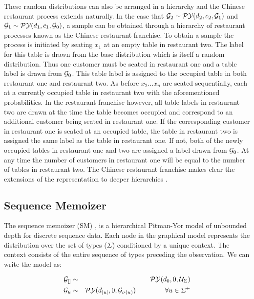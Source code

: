 These random distributions can also be arranged in a hierarchy and the Chinese restaurant process extends naturally.  In the case that $\G_2 \sim \PY(d_2, c_2, \G_1)$ and $\G_1 \sim \PY(d_1, c_1, \G_0)$, a sample can be obtained through a hierarchy of restaurant processes known as the Chinese restaurant franchise.  To obtain a sample the process is initiated by seating $x_1$ at an empty table in restaurant two.  The label for this table is drawn from the base distribution which is itself a random distribution.  Thus one customer must be seated in restaurant one and a table label is drawn from $\G_0$.  This table label is assigned to the occupied table in both restaurant one and restaurant two.  As before $x_2 \ldots x_n$ are seated sequentially, each at a currently occupied table in restaurant two with the aforementioned probabilities.  In the restaurant franchise however, all table labels in restaurant two are drawn at the time the table becomes occupied and correspond to an additional customer being seated in restaurant one.  If the corresponding customer in restaurant one is seated at an occupied table, the table in restaurant two is assigned the same label as the table in restaurant one.  If not, both of the newly occupied tables in restaurant one and two are assigned a label drawn from $\G_0$.  At any time the number of customers in restaurant one will be equal to the number of tables in restaurant two.  The Chinese restaurant franchise makes clear the extensions of the representation to deeper hierarchies  \cite{teh et al ?}.

\subsection{Sequence Memoizer}

The sequence memoizer (SM) \cite{wood}, is a hierarchical Pitman-Yor model of unbounded depth for discrete sequence data.  Each node in the graphical model represents the distribution over the set of types ($\Sigma$) conditioned by a unique context.  The context consists of the entire sequence of types preceding the observation.  We can write the model as:

\begin{eqnarray*}
	\G_{[]} &\sim& \PY(d_0, 0, \mathcal{U}_{\Sigma }) \\
	\G_{u} &\sim& \PY(d_{|u|}, 0, \G_{\sigma(u)}) \hspace{1.5cm} \forall u \in \Sigma^+
\end{eqnarray*}


